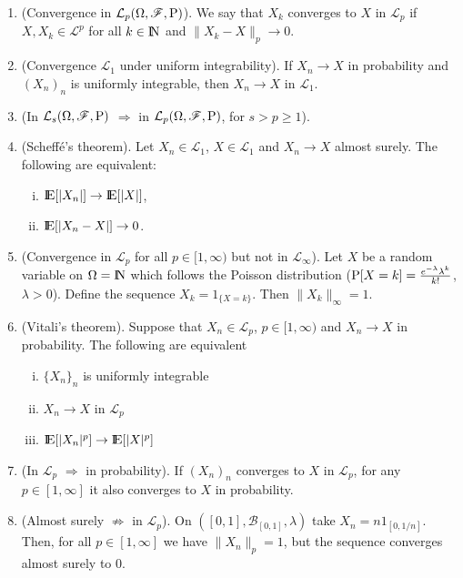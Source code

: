 \documentclass[a4paper,10pt]{article}
\begin{document}
\begin{enumerate}        
 \item (Convergence in $\mathcal{L}_p(\Omega,\mathscr{F},\mathrm{P})$). We say that $X_k$ converges to $X$ in $\mathcal{L}_p$ 
       if $X,X_k\in\mathcal{L}^p$ for all $k\in\N$ and $\|X_k-X\|_p\to 0$.
 \item (Convergence $\mathcal{L}_1$ under uniform integrability). If $X_n \to X$ in probability and $(X_n)_n$ is uniformly
       integrable, then $X_n\to X$ in $\mathcal{L}_1$.
 \item (In $\mathcal{L}_s(\Omega,\mathscr{F},\mathrm{P})$ $\Rightarrow$ in $\mathcal{L}_p(\Omega,\mathscr{F},\mathrm{P})$, for $s>p\geq 1$). 
 \item (Scheff\'e's theorem). Let $X_n\in\mathcal{L}_1$, $X\in\mathcal{L}_1$ and $X_n\to X$ almost surely. The following are 
       equivalent:
       \begin{enumerate}[i.]
        \item $\E[|X_n|] \to \E[|X|]$,
        \item $\E[|X_n - X|]\to  0$.
       \end{enumerate} 
 \item (Convergence in $\mathcal{L}_p$ for all $p\in[1,\infty)$ but not in $\mathcal{L}_\infty$).
       Let $X$ be a random variable on $\Omega=\N$ which follows the Poisson distribution ($\mathrm{P}[X=k]=\frac{e^{-\lambda}\lambda^k}{k!}$, $\lambda>0$).
       Define the sequence $X_k = 1_{\{X=k\}}$. Then $\|X_k\|_\infty=1$.
 \item (Vitali's theorem).
       Suppose that $X_n\in\mathcal{L}_p$, $p\in[1,\infty)$ and $X_n\to X$ in probability.
       The following are equivalent
       \begin{enumerate}[i.]
        \item $\{X_n\}_n$ is uniformly integrable
        \item $X_n\to X$ in $\mathcal{L}_p$
        \item $\E[|X_n|^p] \to \E[|X|^p]$
       \end{enumerate}

 \item (In $\mathcal{L}_p$ $\Rightarrow$ in probability). If $(X_n)_n$ converges to $X$ in $\mathcal{L}_p$, for 
       any $p\in [1,\infty]$ it also converges to $X$ in probability. 
       
 \item (Almost surely $\not\Rightarrow$ in $\mathcal{L}_p$). On $([0,1], \mathcal{B}_{[0,1]}, \lambda)$ take $X_n=n 1_{[0,1/n]}$.
       Then, for all $p\in[1,\infty]$ we have $\|X_n\|_p=1$, but the sequence converges almost surely to $0$.
       

\end{enumerate}
\end{document}
